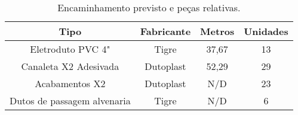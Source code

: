 \begin{table}[H]
\begin{center}
\caption{Encaminhamento previsto e peças relativas.}
\label{tab5}
	\renewcommand{\arraystretch}{1.2}
	\begin{tabular}{|c|c|c|c|}
		\hline
		\textbf{Tipo}       & \textbf{Fabricante} & \multicolumn{1}{l|}{\textbf{Metros}} & \multicolumn{1}{l|}{\textbf{Unidades}} \\ \hline
		Eletroduto PVC 4"         & Tigre               & 37,67                                   & 13                                     \\ \hline
		Canaleta X2 Adesivada         & Dutoplast             & 52,29                                  & 29                                     \\ \hline
		Acabamentos X2 & Dutoplast             & N/D                                  & 23                                     \\ \hline
			Dutos de passagem alvenaria & Tigre             & N/D                                  & 6                                     \\ \hline
	\end{tabular}
    	
\end{center}
\end{table}
